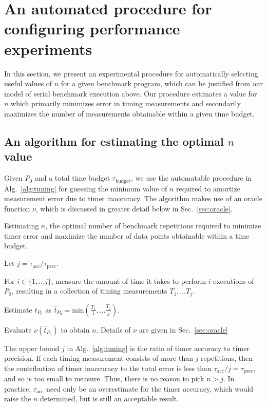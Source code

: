 \documentclass[conference]{IEEEtran}
\begin{document}
\section{An automated procedure for configuring performance experiments}
\label{sec:confexperiment}

In this section, we present an experimental procedure for automatically
selecting useful values of $n$ for a given benchmark program, which can be
justified from our model of serial benchmark execution above. Our procedure
estimates a value for $n$ which primarily minimizes error in timing
measurements and secondarily maximizes the number of measurements obtainable
within a given time budget.

\subsection{An algorithm for estimating the optimal $n$ value}

Given $P_0$ and a total time budget $\tau_{\textrm{budget}}$, we use the automatable
procedure in Alg.~\ref{alg:tuning} for guessing the minimum value of $n$ required to
amortize measurement error due to timer inaccuracy. The algorithm makes use of
an oracle function $\nu$, which is discussed in greater detail below in
Sec.~\ref{sec:oracle}.

\begin{algorithm}
    \caption{Estimating $n$, the optimal number of benchmark repetitions required to
    minimize timer error and maximize the number of data points obtainable within a
    time budget.}
    \label{alg:tuning}
    Let $j = \tau_{\textrm{acc}} / \tau_{\textrm{prec}}$.

    For $i \in \{1, \dots j\}$, measure the amount of time it takes to perform $i$
    executions of $P_0$, resulting in a collection of timing measurements $T_1, \dots T_j$.

    Estimate $t_{P_0}$ as $\hat{t}_{P_0} = \textrm{min}(\frac{T_1}{1}, \dots \frac{T_j}{j})$.

    Evaluate $\nu(\hat{t}_{P_0})$ to obtain $n$. Details of $\nu$ are given in Sec.~\ref{sec:oracle}
\end{algorithm}

The upper bound $j$ in Alg.~\ref{alg:tuning} is the ratio of timer accuracy to
timer precision. If each timing measurement consists of more than $j$
repetitions, then the contribution of timer inaccuracy to the total error is
less than $\tau_\textrm{acc} / j = \tau_\textrm{prec}$, and so is too small to
measure. Thus, there is no reason to pick $n > j$. In practice,
$\tau_\textrm{acc}$ need only be an overestimate for the timer accuracy, which
would raise the $n$ determined, but is still an acceptable result.
\end{document}
